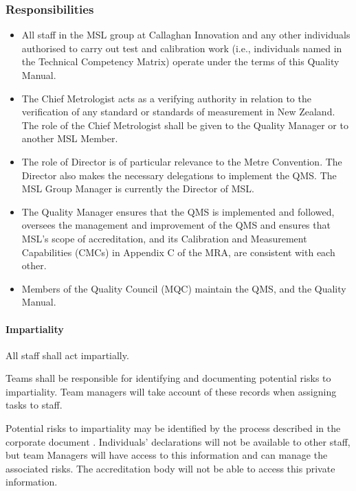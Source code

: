 \subsubsection{Responsibilities} 
\begin{itemize}
\item	All staff in the MSL group at Callaghan Innovation and any other individuals authorised to carry out test and calibration work (i.e., individuals named in the Technical Competency Matrix) operate under the terms of this Quality Manual.
\item	The Chief Metrologist acts as a verifying authority in relation to the verification of any standard or standards of measurement in New Zealand.  The role of the Chief Metrologist shall be given to the Quality Manager or to another MSL Member.  
\item	The role of Director is of particular relevance to the Metre Convention. The Director also makes the necessary delegations to implement the QMS. The MSL Group Manager is currently the Director of MSL. 
\item	The Quality Manager ensures that the QMS is implemented and followed, oversees the management and improvement of the QMS and ensures that MSL's scope of accreditation, and its Calibration and Measurement Capabilities (CMCs) in Appendix C of the MRA, are 
consistent with each other.
\item	Members of the Quality Council (MQC) maintain the QMS, and the Quality Manual.

\end{itemize}

\paragraph{Impartiality}
\label{sssp:impartiality}
All staff shall act impartially.

Teams shall be responsible for identifying and documenting potential risks to impartiality. Team managers will take account of these records when assigning tasks to staff.

Potential risks to impartiality may be identified by the process described in the corporate document . Individuals' declarations will not be available to other staff, but team Managers will have access to this information and can manage the associated risks. The accreditation body will not be able to access this private information. 


